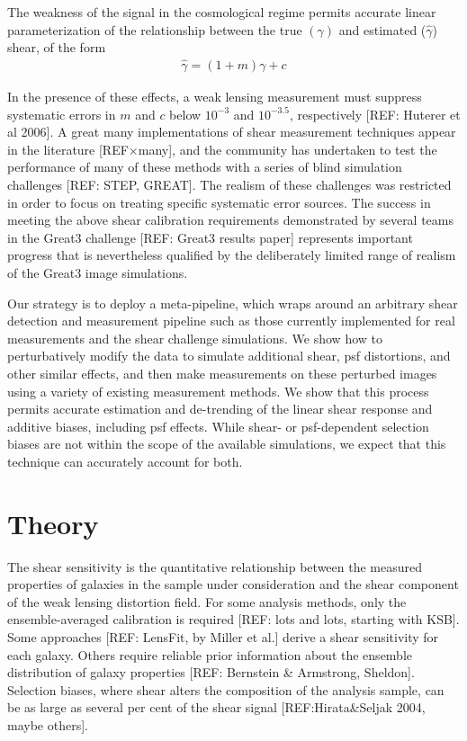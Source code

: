 \documentclass[iop]{emulateapj}
\begin{document}
The weakness of the signal in the cosmological regime permits accurate linear parameterization of the relationship between the true $(\gamma)$ and estimated ($\hat{\gamma}$) shear, of the form
\begin{align}
\hat{\gamma} = (1+m)\gamma + c
\end{align}

In the presence of these effects, a weak lensing measurement must suppress systematic errors in $m$ and $c$ below $10^{-3}$ and $10^{-3.5}$, respectively [REF: Huterer et al 2006]. A great many implementations of shear measurement techniques appear in the literature [REF$\times$many], and the community has undertaken to test the performance of many of these methods with a series of blind simulation challenges [REF: STEP, GREAT]. The realism of these challenges was restricted in order to focus on treating specific systematic error sources. The success in meeting the above shear calibration requirements demonstrated by several teams in the Great3 challenge 
 [REF: Great3 results paper] represents important progress that is nevertheless qualified by the deliberately limited range of realism of the Great3 image simulations. 

Our strategy is to deploy a meta-pipeline, which wraps around an arbitrary shear detection and measurement pipeline such as those currently implemented for real measurements and the shear challenge simulations. We show how to perturbatively modify the data to simulate additional shear, psf distortions, and other similar effects, and then make measurements on these perturbed images using a variety of existing measurement methods. We show that this process permits accurate estimation and de-trending of the linear shear response and additive biases, including psf effects. While shear- or psf-dependent selection biases are not within the scope of the available simulations, we expect that this technique can accurately account for both.

\section{Theory}
The shear sensitivity is the quantitative relationship between the measured properties of galaxies in the sample under consideration and the shear component of the weak lensing distortion field. For some analysis methods, only the ensemble-averaged calibration is required [REF: lots and lots, starting with KSB]. Some approaches [REF: LensFit, by Miller et al.] derive a shear sensitivity for each galaxy. Others require reliable prior information about the ensemble distribution of galaxy properties [REF: Bernstein \& Armstrong, Sheldon]. Selection biases, where shear alters the composition of the analysis sample, can be as large as several per cent of the shear signal [REF:Hirata\&Seljak 2004, maybe others].
\end{document}
